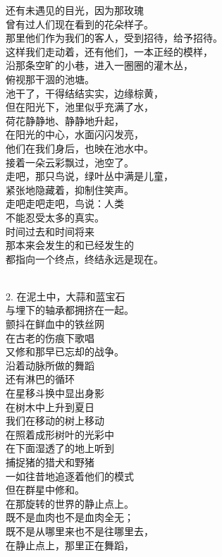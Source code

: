 \documentclass{article}
\begin{document}
还有未遇见的目光，因为那玫瑰\\
曾有过人们现在看到的花朵样子。
\newpage
\\
那里他们作为我们的客人，受到招待，给予招待。\\
这样我们走动着，还有他们，一本正经的模样，\\
沿那条空旷的小巷，进入一圈圈的灌木丛，\\
俯视那干涸的池塘。\\
池干了，干得结结实实，边缘棕黄，\\
但在阳光下，池里似乎充满了水，\\
荷花静静地、静静地升起，\\
在阳光的中心，水面闪闪发亮，\\
他们在我们身后，也映在池水中。\\
接着一朵云彩飘过，池空了。\\
走吧，那只鸟说，绿叶丛中满是儿童，\\
紧张地隐藏着，抑制住笑声。\\
走吧走吧走吧，鸟说：人类\\
不能忍受太多的真实。\\
时间过去和时间将来\\
那本来会发生的和已经发生的\\
都指向一个终点，终结永远是现在。 \par \\
2. 在泥土中，大蒜和蓝宝石\\
与埋下的轴承都拥挤在一起。\\
颤抖在鲜血中的铁丝网
\newpage
\\
在古老的伤痕下歌唱\\
又修和那早已忘却的战争。\\
沿着动脉所做的舞蹈\\
还有淋巴的循环\\
在星移斗换中显出身影\\
在树木中上升到夏日\\
我们在移动的树上移动\\
在照着成形树叶的光彩中\\
在下面湿透了的地上听到\\
捕捉猪的猎犬和野猪\\
一如往昔地追逐着他们的模式\\
但在群星中修和。\\
在那旋转的世界的静止点上。\\
既不是血肉也不是血肉全无；\\
既不是从哪里来也不是往哪里去，\\
在静止点上，那里正在舞蹈，\\
\end{document}
